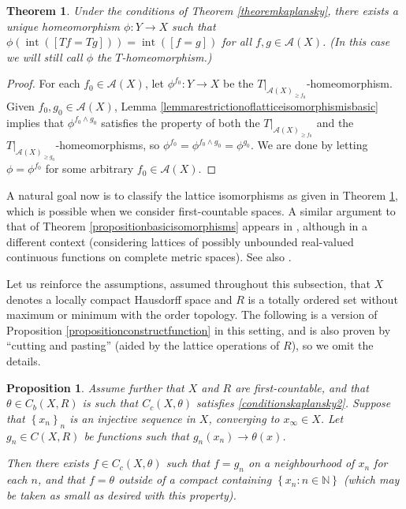 \documentclass[letter,11pt]{amsart}
\theoremstyle{plain}		\newtheorem{theorem}[generalnumbering]{Theorem}
\theoremstyle{plain}		\newtheorem{corollary}[generalnumbering]{Corollary}
\theoremstyle{definition}		\newtheorem{definition}[generalnumbering]{Definition}
\theoremstyle{definition}		\newtheorem{example}[generalnumbering]{Example}
\theoremstyle{plain}		\newtheorem{proposition}[generalnumbering]{Proposition}
\theoremstyle{plain}		\newtheorem{lemma}[generalnumbering]{Lemma}
\theoremstyle{plain}    \newtheorem{plainstyle}[generalnumbering]{\namefordifferentenvironment}
\theoremstyle{plain}    \newtheorem*{plainstyle*}{\namefordifferentenvironment}
\theoremstyle{definition}    \newtheorem{definitionstyle}[generalnumbering]{\namefordifferentenvironment}
\theoremstyle{definition}    \newtheorem*{definitionstyle*}{\namefordifferentenvironment}
\begin{document}
\begin{theorem}\label{theoremkaplanskywithoutlowerbound}
	Under the conditions of Theorem \ref{theoremkaplansky}, there exists a unique homeomorphism $\phi\colon Y\to X$ such that $\phi(\operatorname{int}([Tf=Tg]))=\operatorname{int}([f=g])$ for all $f,g\in\mathcal{A}(X)$. (In this case we will still call $\phi$ the \emph{$T$-homeomorphism}.)
\end{theorem}
\begin{proof}
	For each $f_0\in \mathcal{A}(X)$, let $\phi^{f_0}\colon Y\to X$ be the $T|_{\mathcal{A}(X)_{\geq f_0}}$-homeomorphism. Given $f_0,g_0\in\mathcal{A}(X)$, Lemma \ref{lemmarestrictionoflatticeisomorphismisbasic} implies that $\phi^{f_0\land g_0}$ satisfies the property of both the $T|_{\mathcal{A}(X)_{\geq f_0}}$ and the $T|_{\mathcal{A}(X)_{\geq g_0}}$-homeomorphisms, so $\phi^{f_0}=\phi^{f_0\land g_0}=\phi^{g_0}$. We are done by letting $\phi=\phi^{f_0}$ for some arbitrary $f_0\in\mathcal{A}(X)$.
\end{proof}

A natural goal now is to classify the lattice isomorphisms as given in Theorem \ref{theoremkaplanskywithoutlowerbound}, which is possible when we consider first-countable spaces. A similar argument to that of Theorem \ref{propositionbasicisomorphisms} appears in \cite{MR2995073}, although in a different context (considering lattices of possibly unbounded real-valued continuous functions on complete metric spaces). See also \cite{MR2999998,MR3404615}.

Let us reinforce the assumptions, assumed throughout this subsection, that $X$ denotes a locally compact Hausdorff space and $R$ is a totally ordered set without maximum or minimum with the order topology. The following is a version of Proposition \ref{propositionconstructfunction} in this setting, and is also proven by ``cutting and pasting'' (aided by the lattice operations of $R$), so we omit the details.

\begin{proposition}\label{propositionconstructfunctionkaplansky}
	Assume further that $X$ and $R$ are first-countable, and that $\theta\in C_b(X,R)$ is such that $C_c(X,\theta)$ satisfies \ref{conditionskaplansky2}. Suppose that $\left\{x_n\right\}_n$ is an injective sequence in $X$, converging to $x_\infty\in X$. Let $g_n\in C(X,R)$ be functions such that $g_n(x_n)\to \theta(x)$.
	
	Then there exists $f\in C_c(X,\theta)$ such that $f=g_n$ on a neighbourhood of $x_n$ for each $n$, and that $f=\theta$ outside of a compact containing $\left\{x_n:n\in\mathbb{N}\right\}$ (which may be taken as small as desired with this property).
\end{proposition}
\end{document}
